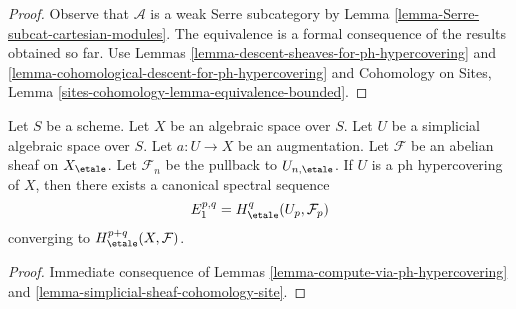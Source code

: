 \begin{proof}
Observe that $\mathcal{A}$ is a weak Serre subcategory by
Lemma \ref{lemma-Serre-subcat-cartesian-modules}.
The equivalence is a
formal consequence of the results obtained so far. Use
Lemmas \ref{lemma-descent-sheaves-for-ph-hypercovering} and
\ref{lemma-cohomological-descent-for-ph-hypercovering} and
Cohomology on Sites, Lemma \ref{sites-cohomology-lemma-equivalence-bounded}.
\end{proof}

\begin{lemma}
\label{lemma-spectral-sequence-ph-hypercovering}
Let $S$ be a scheme. Let $X$ be an algebraic space over $S$.
Let $U$ be a simplicial algebraic space over $S$. Let $a : U \to X$
be an augmentation. Let $\mathcal{F}$ be an abelian sheaf
on $X_\etale$. Let $\mathcal{F}_n$ be the pullback to $U_{n, \etale}$.
If $U$ is a ph hypercovering of $X$, then
there exists a canonical spectral sequence
$$
E_1^{p, q} = H^q_\etale(U_p, \mathcal{F}_p)
$$
converging to $H^{p + q}_\etale(X, \mathcal{F})$.
\end{lemma}

\begin{proof}
Immediate consequence of Lemmas \ref{lemma-compute-via-ph-hypercovering}
and \ref{lemma-simplicial-sheaf-cohomology-site}.
\end{proof}

















